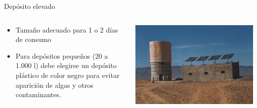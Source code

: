 \documentclass[xcolor={usenames,svgnames,dvipsnames}]{beamer}
\begin{document}
\begin{frame}[plain,label={sec:orga807cf6}]{Depósito elevado}
\begin{columns}
\begin{column}{0.6\columnwidth}
\begin{itemize}
\item \alert{Tamaño adecuado para 1 o 2 días de consumo}
\item Para depósitos pequeños (20 a 1.000 l) debe elegirse un \alert{depósito plástico de color negro}  para evitar aparición de algas y otros contaminantes.
\end{itemize}
\end{column}

\begin{column}{0.6\columnwidth}
\begin{center}
\includegraphics[width=.9\linewidth]{../figs/Bombeo.jpg}
\end{center}
\end{column}
\end{columns}
\end{frame}
\end{document}
